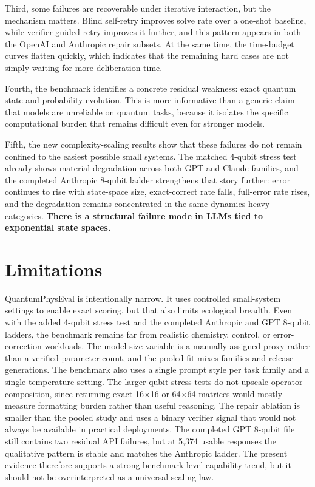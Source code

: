 \documentclass[11pt]{article}
\begin{document}
Third, some failures are recoverable under iterative interaction, but the mechanism matters. Blind self-retry improves solve rate over a one-shot baseline, while verifier-guided retry improves it further, and this pattern appears in both the OpenAI and Anthropic repair subsets. At the same time, the time-budget curves flatten quickly, which indicates that the remaining hard cases are not simply waiting for more deliberation time.

Fourth, the benchmark identifies a concrete residual weakness: exact quantum state and probability evolution. This is more informative than a generic claim that models are unreliable on quantum tasks, because it isolates the specific computational burden that remains difficult even for stronger models.

Fifth, the new complexity-scaling results show that these failures do not remain confined to the easiest possible small systems. The matched 4-qubit stress test already shows material degradation across both GPT and Claude families, and the completed Anthropic 8-qubit ladder strengthens that story further: error continues to rise with state-space size, exact-correct rate falls, full-error rate rises, and the degradation remains concentrated in the same dynamics-heavy categories. \textbf{There is a structural failure mode in LLMs tied to exponential state spaces.}

\section{Limitations}
QuantumPhysEval is intentionally narrow. It uses controlled small-system settings to enable exact scoring, but that also limits ecological breadth. Even with the added 4-qubit stress test and the completed Anthropic and GPT 8-qubit ladders, the benchmark remains far from realistic chemistry, control, or error-correction workloads. The model-size variable is a manually assigned proxy rather than a verified parameter count, and the pooled fit mixes families and release generations. The benchmark also uses a single prompt style per task family and a single temperature setting. The larger-qubit stress tests do not upscale operator composition, since returning exact 16$\times$16 or 64$\times$64 matrices would mostly measure formatting burden rather than useful reasoning. The repair ablation is smaller than the pooled study and uses a binary verifier signal that would not always be available in practical deployments. The completed GPT 8-qubit file still contains two residual API failures, but at 5{,}374 usable responses the qualitative pattern is stable and matches the Anthropic ladder. The present evidence therefore supports a strong benchmark-level capability trend, but it should not be overinterpreted as a universal scaling law.
\end{document}
